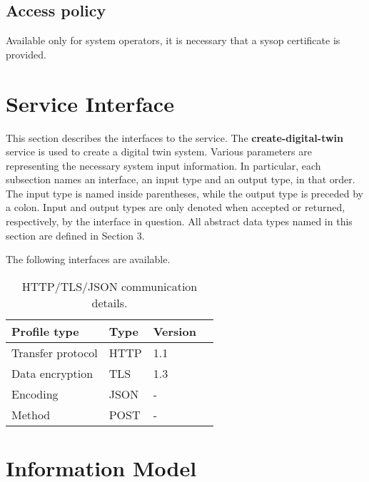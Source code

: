 \documentclass[a4paper]{arrowhead}
\begin{document}
\subsection{Access policy}
\label{sec:accesspolicy}

Available only for system operators, it is necessary that a sysop certificate is provided.

\newpage

\section{Service Interface}
\label{sec:functions}

This section describes the interfaces to the service. The \textbf{create-digital-twin} service is used to create a digital twin system. Various parameters are representing the necessary system input information.
In particular, each subsection names an interface, an input type and an output type, in that order.
The input type is named inside parentheses, while the output type is preceded by a colon.
Input and output types are only denoted when accepted or returned, respectively, by the interface in question. All abstract data types named in this section are defined in Section 3.

The following interfaces are available.


\begin{table}[ht!]
  \centering
  \begin{tabular}{|l|l|l|l|}
    \rowcolor{gray!33} Profile type & Type & Version \\ \hline
    Transfer protocol & HTTP & 1.1 \\ \hline
    Data encryption & TLS & 1.3 \\ \hline
    Encoding & JSON & - \\ \hline
    Method & POST & - \\ \hline
  \end{tabular}
  \caption{HTTP/TLS/JSON communication details.}
  \label{tab:comunication_semantics_profile}
\end{table}

\clearpage

\section{Information Model}
\label{sec:model}
\end{document}
